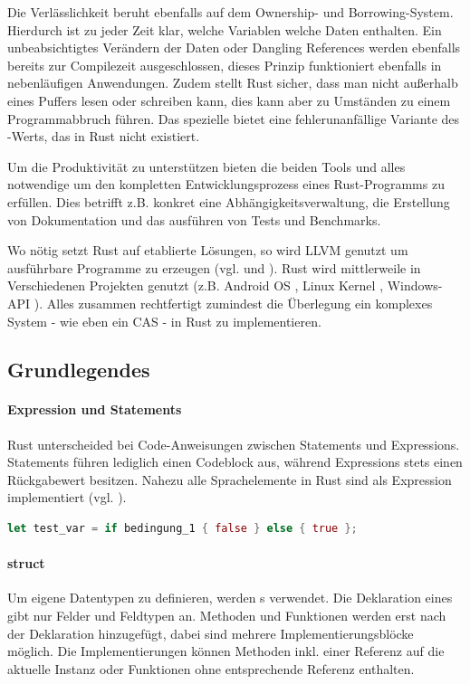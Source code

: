 \documentclass[11pt,a4paper, ngerman]{article}
\begin{document}
Die Verlässlichkeit beruht ebenfalls auf dem Ownership- und Borrowing-System. Hierdurch ist zu jeder Zeit klar, welche Variablen welche Daten enthalten. Ein unbeabsichtigtes Verändern der Daten oder Dangling References werden ebenfalls bereits zur Compilezeit ausgeschlossen, dieses Prinzip funktioniert ebenfalls in nebenläufigen Anwendungen. Zudem stellt Rust sicher, dass man nicht außerhalb eines Puffers lesen oder schreiben kann, dies kann aber zu Umständen zu einem Programmabbruch führen. Das spezielle   bietet eine fehlerunanfällige Variante des -Werts, das in Rust nicht existiert.

Um die Produktivität zu unterstützen bieten die beiden Tools  und  alles notwendige um den kompletten Entwicklungsprozess eines Rust-Programms zu erfüllen. Dies betrifft z.B. konkret eine Abhängigkeitsverwaltung, die Erstellung von Dokumentation und das ausführen von Tests und Benchmarks.

Wo nötig setzt Rust auf etablierte Lösungen, so wird LLVM genutzt um ausführbare Programme zu erzeugen (vgl. \cite{RustcCodegen2} und \cite{RustcCodegen}). Rust wird mittlerweile in Verschiedenen Projekten genutzt (z.B. Android OS \cite{GoogleExample}, Linux Kernel \cite{LinuxExample}, Windows-API \cite{WindowsRust}). Alles zusammen rechtfertigt zumindest die Überlegung ein komplexes System - wie eben ein CAS - in Rust zu implementieren.

\subsection{Grundlegendes}
\paragraph{Expression und Statements} Rust unterscheided bei Code-Anweisungen zwischen Statements und Expressions. Statements führen lediglich einen Codeblock aus, während Expressions stets einen Rückgabewert besitzen. Nahezu alle Sprachelemente in Rust sind als Expression implementiert (vgl. \cite[S. 122 ff.]{BO18}).

\begin{lstlisting}[language=rust, caption={Expression Einführendes Beispiel}]
    let test_var = if bedingung_1 { false } else { true };
\end{lstlisting}

\paragraph{struct} Um eigene Datentypen zu definieren, werden s verwendet. Die Deklaration eines  gibt nur Felder und Feldtypen an. Methoden und Funktionen werden erst nach der Deklaration hinzugefügt, dabei sind mehrere Implementierungsblöcke möglich. Die Implementierungen können Methoden inkl. einer Referenz auf die aktuelle Instanz oder Funktionen ohne entsprechende Referenz enthalten.
\end{document}
